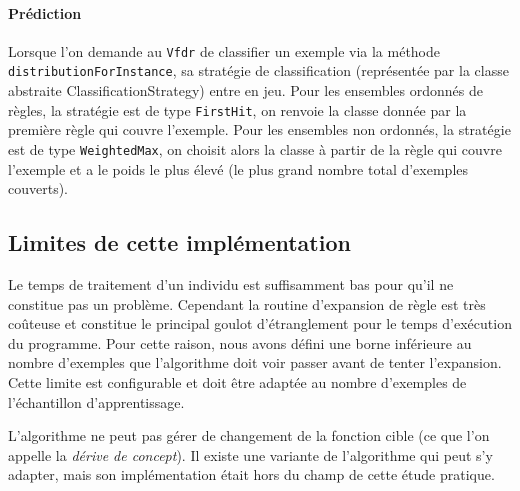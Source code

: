         \paragraph{Prédiction} Lorsque l’on demande au \texttt{Vfdr} de classifier un exemple via la méthode \texttt{distributionForInstance}, sa stratégie de classification (représentée par la classe abstraite ClassificationStrategy) entre en jeu. Pour les ensembles ordonnés de règles, la stratégie est de type \texttt{FirstHit}, on renvoie la classe donnée par la première règle qui couvre l’exemple. Pour les ensembles non ordonnés, la stratégie est de type \texttt{WeightedMax}, on choisit alors la classe à partir de la règle qui couvre l’exemple et a le poids le plus élevé (le plus grand nombre total d’exemples couverts).

    \subsection{Limites de cette implémentation}

        Le temps de traitement d'un individu est suffisamment bas pour qu'il ne constitue pas un problème. Cependant la routine d'expansion de règle est très coûteuse et constitue le principal goulot d'étranglement pour le temps d'exécution du programme. Pour cette raison, nous avons défini une borne inférieure au nombre d'exemples que l'algorithme doit voir passer avant de tenter l'expansion. Cette limite est configurable et doit être adaptée au nombre d'exemples de l'échantillon d'apprentissage.

        L’algorithme ne peut pas gérer de changement de la fonction cible (ce que l'on appelle la \emph{dérive de concept}). Il existe une variante de l'algorithme qui peut s'y adapter, mais son implémentation était hors du champ de cette étude pratique.